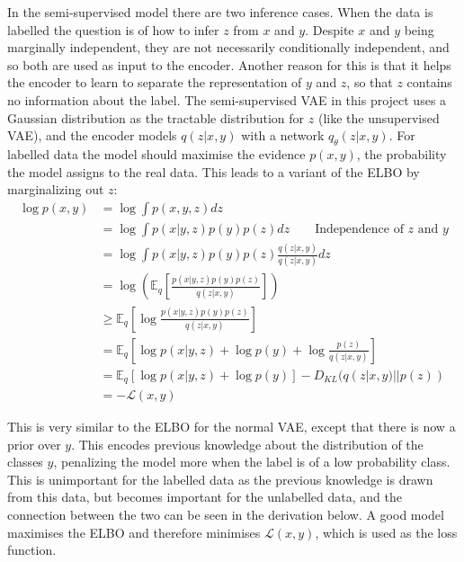 \documentclass[12pt,a4paper,twoside,openright]{report}
\begin{document}
In the semi-supervised model there are two inference cases. When the data is labelled the question is of how to infer $z$ from $x$ and $y$.
Despite $x$ and $y$ being marginally independent, they are not necessarily conditionally independent, and so both are used as input to
the encoder. Another reason for this is that it helps the encoder to learn to separate the representation of $y$ and $z$, so that $z$ contains
no information about the label. The semi-supervised VAE in this project uses a Gaussian distribution as the tractable distribution for 
$z$ (like the unsupervised VAE), and the encoder models $q(z|x, y)$ with a network $q_{\theta}(z|x, y)$. For labelled data the model should 
maximise the evidence $p(x, y)$, the probability the model assigns to the real data. This leads to a variant of the ELBO by marginalizing
out $z$:
\begingroup
\allowdisplaybreaks
\begin{align*}
  \log p(x, y) & = \log \int p(x, y, z) dz \\
  & = \log \int p(x|y, z)p(y)p(z) dz \qquad \text{Independence of $z$ and $y$}\\
  & = \log \int p(x|y, z)p(y)p(z) \frac{q(z|x, y)}{q(z|x, y)} dz\\
  & = \log\left(\mathbb{E}_q \left[\frac{p(x|y, z)p(y)p(z)}{q(z|x, y)}\right]\right) \\
  & \geq \mathbb{E}_q \left[\log\frac{p(x|y, z)p(y)p(z)}{q(z|x, y)}\right] \\
  & = \mathbb{E}_q \left[\log p(x|y, z) + \log p(y) + \log\frac{p(z)}{q(z|x, y)}\right] \\
  & = \mathbb{E}_q [\log p(x|y, z) + \log p(y)] - D_{KL}(q(z|x, y)||p(z)) \\
  & = -\mathcal{L}(x, y)
\end{align*}
\endgroup

This is very similar to the ELBO for the normal VAE, except that there is now a prior over $y$. This encodes previous knowledge about the 
distribution of the classes $y$, penalizing the model more when the label is of a low probability class. This is unimportant for the labelled
data as the previous knowledge is drawn from this data, but becomes important for the unlabelled data, and the connection between the two can be 
seen in the derivation below. A good model maximises the ELBO and therefore minimises $\mathcal{L}(x, y)$, which is used as the loss function.
\end{document}
